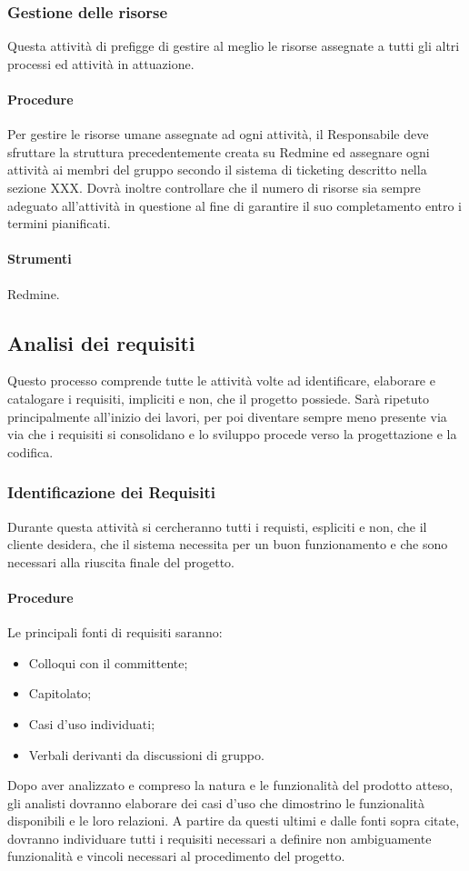 \subsubsection{Gestione delle risorse}
Questa attività di prefigge di gestire al meglio le risorse assegnate a tutti gli altri processi ed attività in attuazione.
\paragraph{Procedure}
Per gestire le risorse umane assegnate ad ogni attività, il Responsabile deve sfruttare la struttura precedentemente creata su Redmine ed assegnare ogni attività ai membri del gruppo secondo il sistema di ticketing descritto nella sezione XXX.
Dovrà inoltre controllare che il numero di risorse sia sempre adeguato all'attività in questione al fine di garantire il suo completamento entro i termini pianificati.

\paragraph{Strumenti}
Redmine.

\subsection{Analisi dei requisiti}
Questo processo comprende tutte le attività volte ad identificare, elaborare e catalogare i requisiti, impliciti e non, che il progetto possiede.
Sarà ripetuto principalmente all'inizio dei lavori, per poi diventare sempre meno presente via via che i requisiti si consolidano e lo sviluppo procede verso la progettazione e la codifica.


\subsubsection{Identificazione dei Requisiti}
Durante questa attività si cercheranno tutti i requisti, espliciti e non, che il cliente desidera, che il sistema necessita per un buon funzionamento e che sono necessari alla riuscita finale del progetto.

\paragraph{Procedure}
Le principali fonti di requisiti saranno:
\begin{itemize}
\item Colloqui con il committente;
\item Capitolato;
\item Casi d'uso individuati;
\item Verbali derivanti da discussioni di gruppo.
\end{itemize}
Dopo aver analizzato e compreso la natura e le funzionalità del prodotto atteso, gli analisti dovranno elaborare dei casi d'uso che dimostrino le funzionalità disponibili e le loro relazioni.
A partire da questi ultimi e dalle fonti sopra citate, dovranno individuare tutti i requisiti necessari a definire non ambiguamente funzionalità e vincoli necessari al procedimento del progetto.


